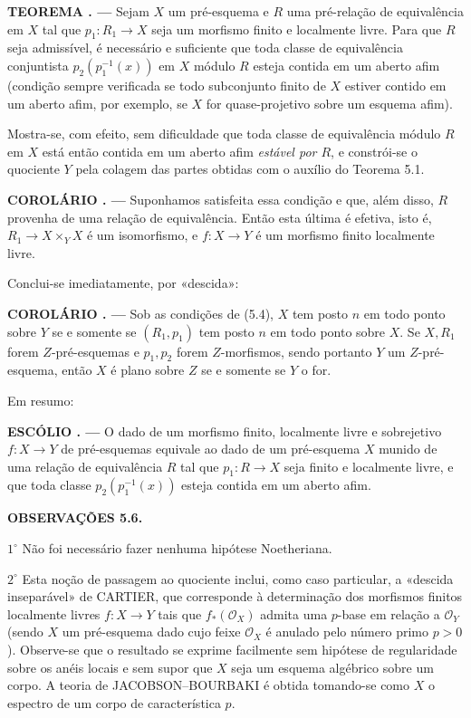 \documentclass[11pt,twoside,openany]{book}
\numberwithin{equation}{section}
\newcommand{\src}[1]{%
  \phantomsection\hypertarget{src:#1}{}%
  \marginpar{\raggedleft\footnotesize\sffamily #1}%
}
\theoremstyle{plain}
\theoremstyle{definition}
\theoremstyle{remark}
\newcommand{\result}[2]{%
  \par\medskip\noindent\textbf{#1%
  \if\relax\detokenize{#2}\relax\else\space#2\fi. ---}\enspace
}
\newcommand{\FgaUnitKey}{frontmatter}
\renewcommand{\src}[1]{%
  \phantomsection\hypertarget{src:\FgaUnitKey:#1}{}%
  \marginpar{\raggedleft\footnotesize\sffamily #1}%
}
\begin{document}
\result{TEOREMA}{5.3} Sejam $X$ um pré-esquema e $R$ uma pré-relação de
equivalência em $X$ tal que $p_1:R_1\to X$ seja um morfismo finito e localmente
livre. Para que $R$ seja admissível, é necessário e suficiente que toda classe
de equivalência conjuntista $p_2(p_1^{-1}(x))$ em $X$ módulo $R$ esteja
contida em um aberto afim (condição sempre verificada se todo subconjunto
finito de $X$ estiver contido em um aberto afim, por exemplo, se $X$ for
quase-projetivo sobre um esquema afim).

Mostra-se, com efeito, sem dificuldade que toda classe de equivalência módulo
$R$ em $X$ está então contida em um aberto afim \emph{estável por $R$}, e
constrói-se o quociente $Y$ pela colagem das partes obtidas com o auxílio do
Teorema 5.1.
\src{112}

\result{COROLÁRIO}{5.4} Suponhamos satisfeita essa condição e que, além disso,
$R$ provenha de uma relação de equivalência. Então esta última é efetiva, isto
é, $R_1\to X\times_Y X$ é um isomorfismo, e $f:X\to Y$ é um morfismo finito
localmente livre.

Conclui-se imediatamente, por «descida»:

\result{COROLÁRIO}{5.5} Sob as condições de (5.4), $X$ tem posto $n$ em todo
ponto sobre $Y$ se e somente se $(R_1,p_1)$ tem posto $n$ em todo ponto sobre
$X$. Se $X,R_1$ forem $Z$-pré-esquemas e $p_1,p_2$ forem $Z$-morfismos, sendo
portanto $Y$ um $Z$-pré-esquema, então $X$ é plano sobre $Z$ se e somente se
$Y$ o for.

Em resumo:

\result{ESCÓLIO}{} O dado de um morfismo finito, localmente livre e
sobrejetivo $f:X\to Y$ de pré-esquemas equivale ao dado de um pré-esquema $X$
munido de uma relação de equivalência $R$ tal que $p_1:R\to X$ seja finito e
localmente livre, e que toda classe $p_2(p_1^{-1}(x))$ esteja contida em um
aberto afim.

\medskip
\noindent\textbf{OBSERVAÇÕES 5.6.}

\smallskip
\noindent $1^\circ$ Não foi necessário fazer nenhuma hipótese Noetheriana.

\smallskip
\noindent $2^\circ$ Esta noção de passagem ao quociente inclui, como caso
particular, a «descida inseparável» de CARTIER, que corresponde à determinação
dos morfismos finitos localmente livres $f:X\to Y$ tais que
$f_*(\mathcal O_X)$ admita uma $p$-base em relação a $\mathcal O_Y$ (sendo $X$
um pré-esquema dado cujo feixe $\mathcal O_X$ é anulado pelo número primo
$p>0$). Observe-se que o resultado se exprime facilmente sem hipótese de
regularidade sobre os anéis locais e sem supor que $X$ seja um esquema
algébrico sobre um corpo. A teoria de JACOBSON--BOURBAKI é obtida tomando-se
como $X$ o espectro de um corpo de característica $p$.
\end{document}
